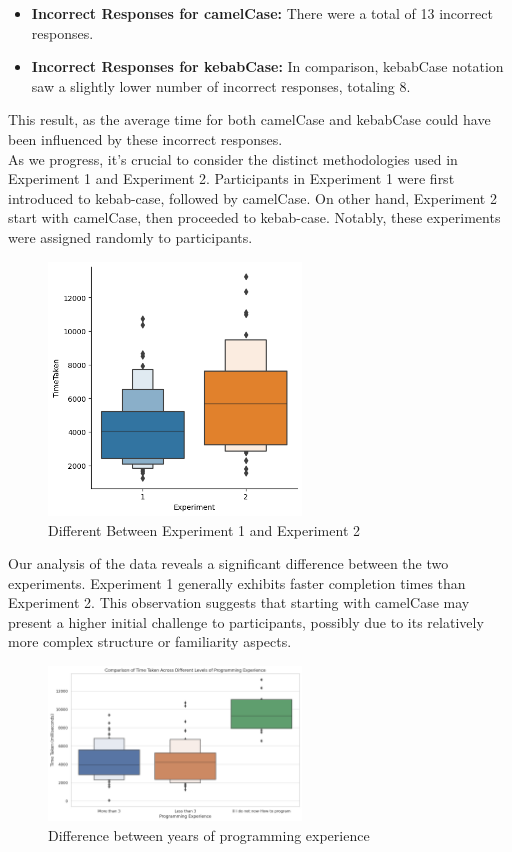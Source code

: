 \documentclass{article}
\begin{document}
\begin{itemize}
    \item \textbf{Incorrect Responses for camelCase:} There were a total of 13 incorrect responses.
    \item \textbf{Incorrect Responses for kebabCase:} In comparison, kebabCase notation saw a slightly lower number of incorrect responses, totaling 8.
\end{itemize}

This result, as the average time for both camelCase and kebabCase could have been influenced by these incorrect responses.\\


As we progress, it's crucial to consider the distinct methodologies used in Experiment 1 and Experiment 2. Participants in Experiment 1 were first introduced to kebab-case, followed by camelCase. On other hand, Experiment 2 start with camelCase, then proceeded to kebab-case. Notably, these experiments were assigned randomly to participants.

\begin{figure}[H]
    \centering
    \includegraphics[width=0.6\textwidth]{difference_experiment.png}
    \caption{Different Between Experiment 1 and Experiment 2}
\end{figure}

Our analysis of the data reveals a significant difference between the two experiments. Experiment 1 generally exhibits faster completion times than Experiment 2. This observation suggests that starting with camelCase may present a higher initial challenge to participants, possibly due to its relatively more complex structure or familiarity aspects.

\begin{figure}[H]
    \centering
    \includegraphics[width=0.6\textwidth]{programming_experience.png}
    \caption{Difference between years of programming experience}
\end{figure}
\end{document}
